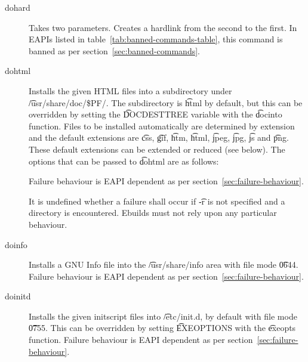 \begin{description}
\item[dohard] Takes two parameters. Creates a hardlink from the second to the first. In EAPIs
    listed in table~\ref{tab:banned-commands-table}, this command is banned as per
    section~\ref{sec:banned-commands}.

\item[dohtml] Installs the given HTML files into a subdirectory under \t{/usr/share/doc/\$PF/}.
The subdirectory is \t{html} by default, but this can be overridden by setting the \t{DOCDESTTREE}
variable with the \t{docinto} function. Files to be installed automatically are determined by
extension and the default extensions are \t{css}, \t{gif}, \t{htm}, \t{html}, \t{jpeg}, \t{jpg},
\t{js} and \t{png}. These default extensions can be extended or reduced (see below). The options
that can be passed to \t{dohtml} are as follows:

    Failure behaviour is EAPI dependent as per section~\ref{sec:failure-behaviour}.

    It is undefined whether a failure shall occur if \t{-r} is not specified and a directory is
    encountered. Ebuilds must not rely upon any particular behaviour.

\item[doinfo] Installs a GNU Info file into the \t{/usr/share/info} area with file mode \t{0644}.
    Failure behaviour is EAPI dependent as per section~\ref{sec:failure-behaviour}.

\item[doinitd] Installs the given initscript files into \t{/etc/init.d}, by default with file mode
    \t{0755}. This can be overridden by setting \t{EXEOPTIONS} with the \t{exeopts} function.
    Failure behaviour is EAPI dependent as per section~\ref{sec:failure-behaviour}.


\end{description}
